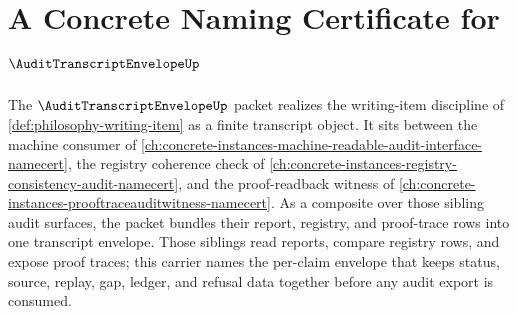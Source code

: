 \chapter{A Concrete Naming Certificate for $\AuditTranscriptEnvelopeUp$}
\label{ch:concrete-instances-audit-transcript-envelope-namecert}

The $\AuditTranscriptEnvelopeUp$ packet realizes the writing-item discipline of \autoref{def:philosophy-writing-item} as a finite transcript object. It sits between the machine consumer of \autoref{ch:concrete-instances-machine-readable-audit-interface-namecert}, the registry coherence check of \autoref{ch:concrete-instances-registry-consistency-audit-namecert}, and the proof-readback witness of \autoref{ch:concrete-instances-prooftraceauditwitness-namecert}. As a composite over those sibling audit surfaces, the packet bundles their report, registry, and proof-trace rows into one transcript envelope. Those siblings read reports, compare registry rows, and expose proof traces; this carrier names the per-claim envelope that keeps status, source, replay, gap, ledger, and refusal data together before any audit export is consumed.

